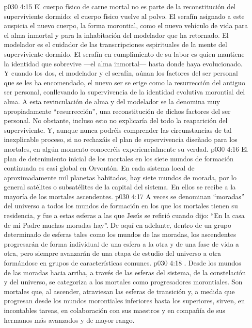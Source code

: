 \vs p030 4:15 El cuerpo físico de carne mortal no es parte de la reconstitución del superviviente dormido; el cuerpo físico vuelve al polvo. El serafín asignado a este auspicia el nuevo cuerpo, la forma morontial, como el nuevo vehículo de vida para el alma inmortal y para la inhabitación del modelador que ha retornado. El modelador es el cuidador de las transcripciones espirituales de la mente del superviviente dormido. El serafín en cumplimiento de su labor es quien mantiene la identidad que sobrevive ---el alma inmortal--- hasta donde haya evolucionado. Y cuando los dos, el modelador y el serafín, aúnan los factores del ser personal que se les ha encomendado, el nuevo ser se erige como la resurrección del antiguo ser personal, conllevando la supervivencia de la identidad evolutiva morontial del alma. A esta revinculación de alma y del modelador se la denomina muy apropiadamente “resurrección”, una reconstitución de dichos factores del ser personal. No obstante, incluso esto no explicaría del todo la reaparición del  superviviente. Y, aunque nunca podréis comprender las circunstancias de tal inexplicable proceso, si no rechazáis el plan de supervivencia diseñado para los mortales, en algún momento conoceréis experiencialmente su verdad.
\vs p030 4:16 \pc El plan de detenimiento inicial de los mortales en los siete mundos de formación continuada es casi global en Orvontón. En cada sistema local de aproximadamente mil planetas habitados, hay siete mundos de morada, por lo general satélites o subsatélites de la capital del sistema. En ellos se recibe a la mayoría de los mortales ascendentes.
\vs p030 4:17 A veces se denominan “moradas” del universo a todos los mundos de formación en los que los mortales tienen su residencia, y fue a estas esferas a las que Jesús se refirió cuando dijo: “En la casa de mi Padre muchas moradas hay”. De aquí en adelante, dentro de un grupo determinado de esferas tales como los mundos de las moradas, los ascendentes progresarán de forma individual de una esfera a la otra y de una fase de vida a otra, pero siempre avanzarán de una etapa de estudio del universo a otra formándose en grupos de características comunes.
\vs p030 4:18 . Desde los mundos de las moradas hacia arriba, a través de las esferas del sistema, de la constelación y del universo, se categoriza a los mortales como progresadores morontiales. Son mortales que, al ascender, atraviesan las esferas de transición y, a medida que progresan desde los mundos morontiales inferiores hasta los superiores, sirven, en incontables tareas, en colaboración con sus maestros y en compañía de sus hermanos más avanzados y de mayor rango.
